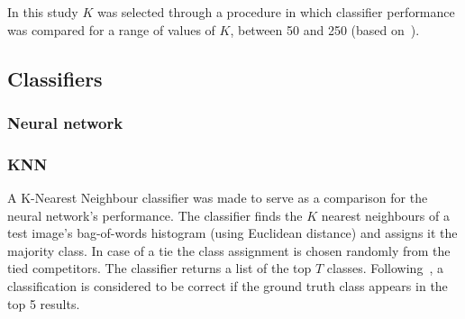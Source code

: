 In this study $K$ was selected through a procedure in which classifier performance was compared for a range of values of $K$, between 50 and 250 (based on~\cite{Nguy2013}).



\subsection{Classifiers}

\subsubsection{Neural network}


\subsubsection{KNN}
A K-Nearest Neighbour classifier was made to serve as a comparison for the neural network's performance.
The classifier finds the $K$ nearest neighbours of a test image's bag-of-words histogram (using Euclidean distance) and assigns it the majority class.
In case of a tie the class assignment is chosen randomly from the tied competitors.
The classifier returns a list of the top $T$ classes.
Following~\cite{Wang2011, Belh2008}, a classification is considered to be correct if the ground truth class appears in the top 5 results. 
